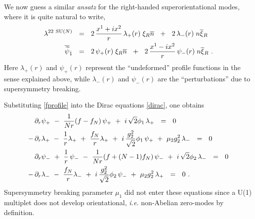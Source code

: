 \documentclass[12pt]{article}
\newcommand{\p}{\partial}
\newcommand{\wt}{\widetilde}
\newcommand{\ov}{\overline}
\begin{document}
	We now guess a similar {\it ansatz} for the right-handed superorientational modes, where it
	is quite natural to write,
\begin{align}
%
\notag
	\lambda^{22\ \text{SU($N$)}} & ~~=~~ 2\, \frac{x^1 + ix^2}{r}\, \lambda_+(r) \; \xi_R\ov{n}
				~~+~~  2\, \lambda_-(r)\; n\ov{\xi}{}_R
	\\
%
\label{fprofile}
	\ov{\wt{\psi}}{}_{\dot{1}} & ~~=~~ 2\, \psi_+(r)\; \xi_R \ov{n} 
				~~+~~  2\, \frac{x^1 - i x^2}{r}\, \psi_-(r)\; n\ov{\xi}{}_R~.
\end{align}
	Here $ \lambda_+(r) $ and $ \psi_+(r) $ represent the ``undeformed'' profile functions in the sense
	explained above, while $ \lambda_-(r) $ and $ \psi_-(r) $ are the ``perturbations'' due to supersymmetry
	breaking.

	Substituting \eqref{fprofile} into the Dirac equations \eqref{dirac}, one obtains
\begin{align}
%
\notag
&
	\p_r \psi_+ ~-~ \frac{1}{Nr} (f-f_N)\, \psi_+ ~+~ i\,\sqrt{2}\phi_1\,\lambda_+ ~~=~~ 0
	\\
%
\notag
	-\, & \p_r\lambda_+ ~-~ \frac{1}{r}\lambda_+ ~+~ \frac{f_N}{r}\lambda_+ 
		~+~ i\,\frac{g_2^2}{\sqrt{2}}\phi_1\, \psi_+ ~+~ \mu_2 g_2^2\, \lambda_-  ~~=~~ 0
	\\
%
\label{fermeqs}
&
	\p_r \psi_- ~+~ \frac{1}{r}\, \psi_- ~-~ \frac{1}{Nr}(f + (N-1)f_N)\, \psi_- 
							~+~ i\,\sqrt{2}\phi_2\, \lambda_- ~~=~~ 0
	\\
%
\notag
	-\, & \p_r\lambda_- ~-~ \frac{f_N}{r}\lambda_- ~+~ i\,\frac{g_2^2}{\sqrt{2}}\phi_2\, \psi_- 
								~+~ \mu_2 g_2^2\, \lambda_+ ~~=~~ 0
	~.
\end{align}
	Supersymmetry breaking parameter $ \mu_1 $ did not enter these equations since a U(1) 
	multiplet does not develop orientational, {\it i.e.} non-Abelian zero-modes by definition.

\end{document}
